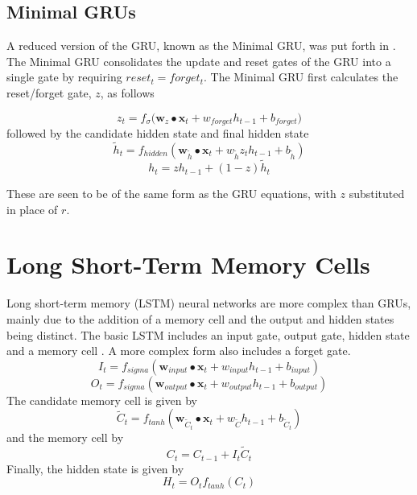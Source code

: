 \documentclass[]{article}
\begin{document}
\subsection{Minimal GRUs}
A reduced version of the GRU, known as the Minimal GRU, was put forth in \cite{zhou2016minimal}. The Minimal GRU consolidates the update and reset gates of the GRU into a single gate by requiring $reset_{t} = forget_{t}$. The Minimal GRU first calculates the reset/forget gate, $z$, as follows

\begin{equation}
z_{t} = f_{\sigma} \bigg( \textbf{w}_{z} \bullet \textbf{x}_{t}  + w_{forget} h_{t-1} + b_{forget} \bigg)
\end{equation}
followed by the candidate hidden state and final hidden state
\begin{equation}
\tilde{h}_{t} = f_{hidden}(\textbf{w}_{\tilde{h}} \bullet \textbf{x}_{t} + w_{\tilde{h}} z_{t} h_{t-1} + b_{\tilde{h}}) 
\end{equation}
\begin{equation}
h_{t} = zh_{t-1} + (1-z) \tilde{h}_{t}
\end{equation}

These are seen to be of the same form as the GRU equations, with $z$ substituted in place of $r$.

\section{Long Short-Term Memory Cells}
Long short-term memory (LSTM) neural networks are more complex than GRUs, mainly due to the addition of a memory cell and the output and hidden states being distinct. The basic LSTM includes an input gate, output gate, hidden state and a memory cell \cite{yu2019review}. A more complex form also includes a forget gate.
\begin{equation}
I_{t} = f_{sigma}(\textbf{w}_{input} \bullet \textbf{x}_{t} + w_{input} h_{t-1} + b_{input})
\end{equation}
\begin{equation}
O_{t} = f_{sigma}(\textbf{w}_{output} \bullet \textbf{x}_{t} + w_{output} h_{t-1} + b_{output})
\end{equation}
The candidate memory cell is given by
\begin{equation}
\tilde{C}_{t} = f_{tanh}(\textbf{w}_{\tilde{C}_{t}} \bullet \textbf{x}_{t} + w_{\tilde{C}} h_{t-1} + b_{\tilde{C}_{t}})
\end{equation}
and the memory cell by
\begin{equation}
C_{t} = C_{t-1} + I_{t} \tilde{C}_{t}
\end{equation}
Finally, the hidden state is given by
\begin{equation}
H_{t} = O_{t}f_{tanh}(C_{t})
\end{equation}
\end{document}

